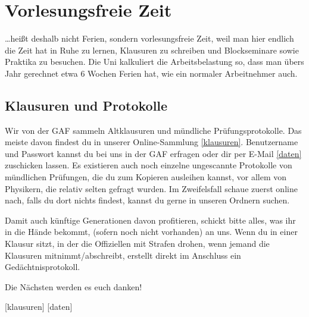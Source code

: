 ﻿\chapter{Vorlesungsfreie Zeit}

\ldots heißt deshalb nicht Ferien, sondern vorlesungsfreie Zeit, weil man hier
endlich die Zeit hat in Ruhe zu lernen, Klausuren zu schreiben und
Blockseminare sowie Praktika zu besuchen. Die Uni kalkuliert die
Arbeitsbelastung so, dass man übers Jahr gerechnet etwa 6 Wochen Ferien hat, wie
ein normaler Arbeitnehmer auch.

\section{Klausuren und Protokolle}
Wir von der GAF sammeln Altklausuren und mündliche Prüfungsprotokolle. Das
meiste davon findest du in unserer Online-Sammlung \ref{klausuren}.
Benutzername und Passwort kannst du bei uns in der GAF erfragen oder dir per
E-Mail \ref{daten} zuschicken lassen.  Es existieren auch noch einzelne
ungescannte Protokolle von mündlichen Prüfungen, die du zum Kopieren ausleihen
kannst, vor allem von Physikern, die relativ selten gefragt wurden. Im
Zweifelsfall schaue zuerst online nach, falls du dort nichts findest, kannst
du gerne in unseren Ordnern suchen.

Damit auch künftige Generationen davon profitieren, schickt bitte alles,
was ihr in die Hände bekommt, (sofern noch nicht vorhanden) an uns.
Wenn du in einer Klausur sitzt, in der die Offiziellen mit Strafen
drohen, wenn jemand die Klausuren mitnimmt/abschreibt, erstellt
direkt im Anschluss ein Gedächtnisprotokoll.

Die Nächsten werden es euch danken!

\begin{urlList}
	[klausuren]
	[daten]
\end{urlList}

